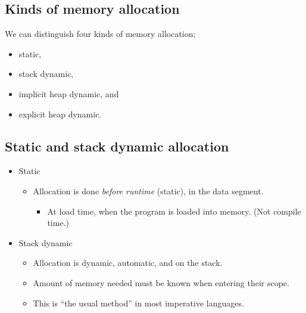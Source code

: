 \documentclass[11pt]{article}
\theoremstyle{definition}
\begin{document}
\subsection{Kinds of memory allocation}
\label{sec:org145c219}
We can distinguish four kinds of memory allocation;
\begin{itemize}
\item static,
\item stack dynamic,
\item implicit heap dynamic, and
\item explicit heap dynamic.
\end{itemize}

\subsection{Static and stack dynamic allocation}
\label{sec:org34df112}
\begin{itemize}
\item Static
\begin{itemize}
\item Allocation is done \emph{before runtime} (static), in the data segment.
\begin{itemize}
\item At load time, when the program is loaded into memory.
(Not compile time.)
\end{itemize}
\end{itemize}
\item Stack dynamic
\begin{itemize}
\item Allocation is dynamic, automatic, and on the stack.
\item Amount of memory needed must be known when entering their scope.
\item This is “the usual method” in most imperative languages.
\end{itemize}
\end{itemize}
\end{document}

